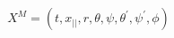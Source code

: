 \begin{equation*}
X^{M}=\left( t,x_{||},r,\theta ,\psi ,\theta ^{\prime },\psi ^{\prime },\phi
\right)
\end{equation*}

